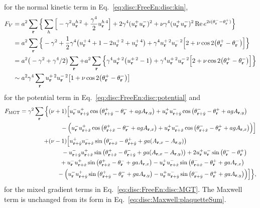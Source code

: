 for the normal kinetic term in Eq.~\eqref{eq:disc:FreeEn:disc:kin},
\begin{equation}
  \begin{split}
	F_V &= a^2\sum_\v{r}\Big\{\sum_h\Big[-\gamma^2u^{h\,2}_\v{r} + \frac{\gamma^4}{2}u^{h\,4}_\v{r}\Big] + 2\gamma^4(u^+_\v{r}u^-_\v{r})^2 + \nu\gamma^4(u^+_\v{r}u^-_\v{r})^2\Re e^{2i(\theta^-_\v{r}-\theta^+_\v{r})}\Big\}\\
	&= a^2\sum_\v{r}\Big\{-\gamma^2 + \frac{1}{2}\gamma^4\big(u^{+\,4}_\v{r} + 1 - 2u^{+\,2}_\v{r} + u^{+\,4}_\v{r}\big) + \gamma^4u^{+\,2}_\v{r}u^{-\,2}_\v{r}\Big[2+\nu\cos 2\big(\theta^+_\v{r}-\theta^-_\v{r}\big)\Big]\Big\}\\
	&= a^2\big(-\gamma^2 + \gamma^4/2\big)\sum_\v{r} + a^2\sum_\v{r}\Big\{\gamma^4u^{+\,2}_\v{r}\big( u^{+\,2}_\v{r}-1\big) + \gamma^4u^{+\,2}_\v{r}u^{-\,2}_\v{r}\Big[2+\nu\cos 2\big(\theta^+_\v{r}-\theta^-_\v{r}\big)\Big]\Big\}\\
	&\sim a^2\gamma^4\sum_\v{r}u^{+\,2}_\v{r}u^{-\,2}_\v{r}\big[1+\nu\cos 2\big(\theta^+_\v{r}-\theta^-_\v{r}\big)\big]
  \end{split}
  \label{eq:disc:cp1:FV}
\end{equation}
for the potential term in Eq.~\eqref{eq:disc:FreeEn:disc:potential} and
\begin{equation}
  \begin{split}
	F_\text{MGT} = \gamma^2\sum_\v{r}\Big\{&(\nu+1)\Big[u^-_\v{r}u^+_{\v{r}+\hat{y}}\cos\big(\theta^+_{\v{r}+\hat{y}} - \theta^-_\v{r} + agA_{\v{r},y}\big)
+ u^+_\v{r}u^-_{\v{r}+\hat{y}}\cos\big(\theta^-_{\v{r} + \hat{y}} - \theta^+_\v{r} + agA_{\v{r},y}\big)\\
&\phantom{(\nu+}\;-\Big( u^-_\v{r}u^+_{\v{r}+\hat{x}}\cos\big(\theta^+_{\v{r}+\hat{x}} - \theta^-_\v{r} + agA_{\v{r},x}\big)
+ u^+_\v{r}u^-_{\v{r}+\hat{x}}\cos\big(\theta^-_{\v{r} + \hat{x}} - \theta^+_\v{r} + agA_{\v{r},x}\big)\Big)\Big]\\
+&(\nu-1)\Big[u^+_{\v{r}+\hat{y}}u^-_{\v{r}+\hat{x}}\sin\big(\theta^-_{\v{r}+\hat{x}} - \theta^+_{\v{r}+\hat{y}} + ga(A_{\v{r},x} - A_{\v{r},y})\big)\\
  &\phantom{(\nu+}\;\,-u^-_{\v{r}+\hat{y}}u^+_{\v{r}+\hat{x}}\sin\big(\theta^+_{\v{r}+\hat{x}} - \theta^-_{\v{r}+\hat{y}} + ga(A_{\v{r},x} - A_{\v{r},y})\big) + 2u^+_\v{r}u^-_\v{r}\sin\big(\theta^-_\v{r}-\theta^+_\v{r}\big)\\
  &\phantom{(\nu0}\;\,+u^-_\v{r}u^+_{\v{r}+\hat{x}}\sin\big(\theta^+_{\v{r}+\hat{x}} - \theta^-_\v{r}+gaA_{\v{r},x}\big)
  -u^+_\v{r}u^-_{\v{r}+\hat{x}}\sin\big(\theta^-_{\v{r}+\hat{x}} - \theta^+_\v{r}+gaA_{\v{r},x}\big)\\
  &\phantom{(\nu0}-\Big(u^-_\v{r}u^+_{\v{r}+\hat{y}}\sin\big(\theta^+_{\v{r}+\hat{y}} - \theta^-_\v{r}+gaA_{\v{r},y}\big)
-u^+_\v{r}u^-_{\v{r}+\hat{y}}\sin\big(\theta^-_{\v{r}+\hat{y}} - \theta^+_\v{r}+gaA_{\v{r},y}\big)\Big)\Big]\Big\},
  \end{split}
  \label{eq:disc:cp1:MGT}
\end{equation}
for the mixed gradient terms in Eq.~\eqref{eq:disc:FreeEn:disc:MGT}. The Maxwell term is unchanged from its form in Eq.~\eqref{eq:disc:Maxwell:plaquetteSum}.
